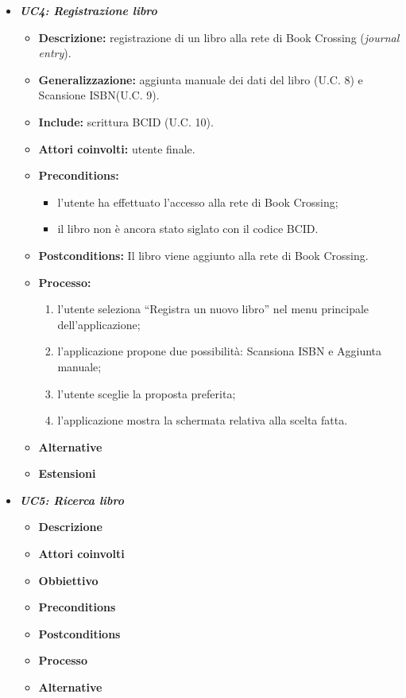 \begin{itemize}
	\item \textbf{\textit{UC4: Registrazione libro}}
	\begin{itemize}
		\item \textbf{Descrizione:} registrazione di un libro alla rete di Book Crossing (\textit{journal entry}).
		\item \textbf{Generalizzazione:} aggiunta manuale dei dati del libro (U.C. 8) e Scansione ISBN(U.C. 9).
		\item \textbf{Include:} scrittura BCID (U.C. 10).
		\item \textbf{Attori coinvolti:} utente finale.
		\item \textbf{Preconditions:}
		\begin{itemize}
			\item l’utente ha effettuato l’accesso alla rete di Book Crossing;
			\item il libro non è ancora stato siglato con il codice BCID.
		\end{itemize}
		\item \textbf{Postconditions:} Il libro viene aggiunto alla rete di Book Crossing.		
		\item \textbf{Processo:} 
		\begin{enumerate}
			\item l’utente seleziona “Registra un nuovo libro” nel menu principale dell’applicazione;
			\item l’applicazione propone due possibilità: Scansiona ISBN e Aggiunta manuale;
			\item l’utente sceglie la proposta preferita;
			\item l’applicazione mostra la schermata relativa alla scelta fatta.
		\end{enumerate}
		\item \textbf{Alternative}
		\item \textbf{Estensioni}
	\end{itemize}
	\item \textbf{\textit{UC5: Ricerca libro}}
	\begin{itemize}
		\item \textbf{Descrizione}
		\item \textbf{Attori coinvolti}
		\item \textbf{Obbiettivo}
		\item \textbf{Preconditions}
		\item \textbf{Postconditions}
		\item \textbf{Processo}
		\item \textbf{Alternative}

\end{itemize}
\end{itemize}
